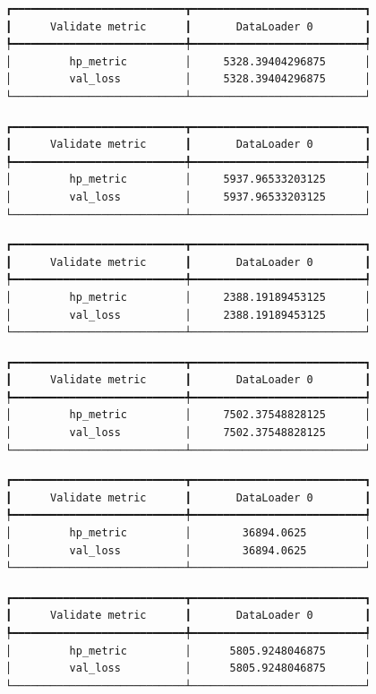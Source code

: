 \documentclass[
  letterpaper,
  DIV=11,
  numbers=noendperiod]{scrreprt}
\begin{document}
\begin{verbatim}
┏━━━━━━━━━━━━━━━━━━━━━━━━━━━┳━━━━━━━━━━━━━━━━━━━━━━━━━━━┓
┃      Validate metric      ┃       DataLoader 0        ┃
┡━━━━━━━━━━━━━━━━━━━━━━━━━━━╇━━━━━━━━━━━━━━━━━━━━━━━━━━━┩
│         hp_metric         │     5328.39404296875      │
│         val_loss          │     5328.39404296875      │
└───────────────────────────┴───────────────────────────┘
\end{verbatim}

\begin{verbatim}
┏━━━━━━━━━━━━━━━━━━━━━━━━━━━┳━━━━━━━━━━━━━━━━━━━━━━━━━━━┓
┃      Validate metric      ┃       DataLoader 0        ┃
┡━━━━━━━━━━━━━━━━━━━━━━━━━━━╇━━━━━━━━━━━━━━━━━━━━━━━━━━━┩
│         hp_metric         │     5937.96533203125      │
│         val_loss          │     5937.96533203125      │
└───────────────────────────┴───────────────────────────┘
\end{verbatim}

\begin{verbatim}
┏━━━━━━━━━━━━━━━━━━━━━━━━━━━┳━━━━━━━━━━━━━━━━━━━━━━━━━━━┓
┃      Validate metric      ┃       DataLoader 0        ┃
┡━━━━━━━━━━━━━━━━━━━━━━━━━━━╇━━━━━━━━━━━━━━━━━━━━━━━━━━━┩
│         hp_metric         │     2388.19189453125      │
│         val_loss          │     2388.19189453125      │
└───────────────────────────┴───────────────────────────┘
\end{verbatim}

\begin{verbatim}
┏━━━━━━━━━━━━━━━━━━━━━━━━━━━┳━━━━━━━━━━━━━━━━━━━━━━━━━━━┓
┃      Validate metric      ┃       DataLoader 0        ┃
┡━━━━━━━━━━━━━━━━━━━━━━━━━━━╇━━━━━━━━━━━━━━━━━━━━━━━━━━━┩
│         hp_metric         │     7502.37548828125      │
│         val_loss          │     7502.37548828125      │
└───────────────────────────┴───────────────────────────┘
\end{verbatim}

\begin{verbatim}
┏━━━━━━━━━━━━━━━━━━━━━━━━━━━┳━━━━━━━━━━━━━━━━━━━━━━━━━━━┓
┃      Validate metric      ┃       DataLoader 0        ┃
┡━━━━━━━━━━━━━━━━━━━━━━━━━━━╇━━━━━━━━━━━━━━━━━━━━━━━━━━━┩
│         hp_metric         │        36894.0625         │
│         val_loss          │        36894.0625         │
└───────────────────────────┴───────────────────────────┘
\end{verbatim}

\begin{verbatim}
┏━━━━━━━━━━━━━━━━━━━━━━━━━━━┳━━━━━━━━━━━━━━━━━━━━━━━━━━━┓
┃      Validate metric      ┃       DataLoader 0        ┃
┡━━━━━━━━━━━━━━━━━━━━━━━━━━━╇━━━━━━━━━━━━━━━━━━━━━━━━━━━┩
│         hp_metric         │      5805.9248046875      │
│         val_loss          │      5805.9248046875      │
└───────────────────────────┴───────────────────────────┘
\end{verbatim}
\end{document}
